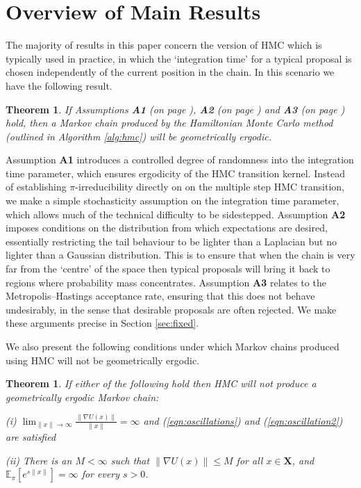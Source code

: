 \documentclass[bj,numbers,noshowframe]{imsart}
\newcommand{\X}{\mathbf{X}}
\theoremstyle{definition}
\theoremstyle{plain}
\newtheorem{thm}[defn]{Theorem}
\theoremstyle{definition}
\begin{document}
\section{Overview of Main Results}
\label{sec:main}

The majority of results in this paper concern the version of HMC which is typically used in practice, in which the `integration time' for a typical proposal is chosen independently of the current position in the chain.  In this scenario we have the following result.

\begin{thm} If Assumptions \textbf{A1} (on page \pageref{ass:A1}), \textbf{A2} (on page \pageref{ass:A2}) and \textbf{A3} (on page \pageref{ass:A3}) hold, then a Markov chain produced by the Hamiltonian Monte Carlo method (outlined in Algorithm \ref{alg:hmc}) will be geometrically ergodic.
\end{thm}

Assumption \textbf{A1} introduces a controlled degree of randomness into the integration time parameter, which ensures ergodicity of the HMC transition kernel.  Instead of establishing $\pi$-irreducibility directly on on the multiple step HMC transition, we make a simple stochasticity assumption on the integration time parameter, which allows much of the technical difficulty to be sidestepped.  Assumption \textbf{A2} imposes conditions on the distribution from which expectations are desired, essentially restricting the tail behaviour to be lighter than a Laplacian but no lighter than a Gaussian distribution.  This is to ensure that when the chain is very far from the `centre' of the space then typical proposals will bring it back to regions where probability mass concentrates.  Assumption \textbf{A3} relates to the Metropolis--Hastings acceptance rate, ensuring that this does not behave undesirably, in the sense that desirable proposals are often rejected.  We make these arguments precise in Section \ref{sec:fixed}.

We also present the following conditions under which Markov chains produced using HMC will not be geometrically ergodic.

\begin{thm} \label{thm:negative}
If either of the following hold then HMC will \emph{not} produce a geometrically ergodic Markov chain:

\vspace{0.2cm}

(i) $\lim_{\|x\| \to \infty}\frac{\|\nabla U(x)\|}{\|x\|} = \infty$ and (\ref{eqn:oscillations}) and (\ref{eqn:oscillation2}) are satisfied

\vspace{0.2cm}

(ii) There is an $M<\infty$ such that $\|\nabla U(x)\| \leq M$ for all $x \in \X$, and $\mathbb{E}_\pi[e^{s\|x\|}]=\infty$ for every $s>0$.

\end{thm}
\end{document}
